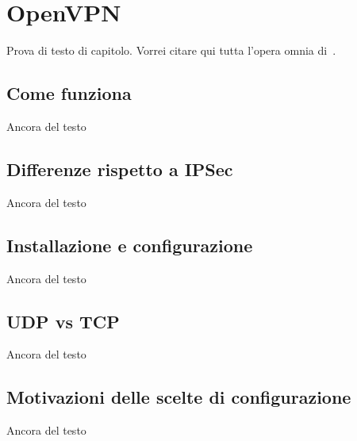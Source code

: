 \section{OpenVPN}\label{se:prima-sezione}

Prova di testo di capitolo. Vorrei citare qui tutta l'opera omnia di~\cite{IEEE:1990,WIKI:INTEROP,BOX:1997,AHL:1996}.

\subsection{Come funziona}
Ancora del testo

\subsection{Differenze rispetto a IPSec}
Ancora del testo

\subsection{Installazione e configurazione}
Ancora del testo

\subsection{UDP vs TCP}
Ancora del testo

\subsection{Motivazioni delle scelte di configurazione}
Ancora del testo
